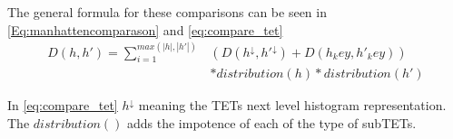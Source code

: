 	The general formula for these comparisons can be seen in \autoref{Eq:manhattencomparason} and \autoref{eq:compare_tet}
	\begin{equation}\label{eq:compare_tet}
	\begin{split}
	D(h,h') = \sum_{i=1}^{max(|h|,|h'|)} & (D(h^{\downarrow}, h'^{\downarrow})+ D(h_key, h'_key))  \\
	& * distribution(h) * distribution (h')
	\end{split}
	\end{equation}
	
	In \autoref{eq:compare_tet} $h^{\downarrow}$ meaning the TETs next level histogram representation. The $distribution()$ adds the impotence of each of the type of subTETs.
